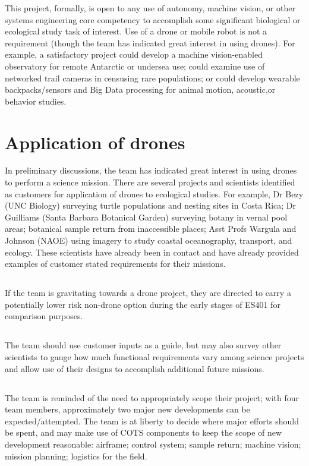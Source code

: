 \documentclass[10pt,courier]{navymemo}
\begin{document}
This project, formally, is open to any use of autonomy, machine vision, or other systems engineering core competency to accomplish some significant biological or ecological study task of interest. Use of a drone or mobile robot is not a requirement (though the team has indicated great interest in using drones). For example, a satisfactory project could develop a machine vision-enabled observatory for remote Antarctic or undersea use; could examine use of networked trail cameras in censusing rare populations; or could develop wearable backpacks/sensors and Big Data processing for animal motion, acoustic,or behavior studies.

\section{Application of drones} In preliminary discussions, the team has indicated great interest in using drones to perform a science mission. There are several projects and scientists identified as customers for application of drones to ecological studies. For example, Dr Bezy (UNC Biology) surveying turtle populations and nesting sites in Costa Rica; Dr Guilliams (Santa Barbara Botanical Garden) surveying botany in vernal pool areas; botanical sample return from inaccessible places; Asst Profs Wargula and Johnson (NAOE) using imagery to study coastal oceanography, transport, and ecology. These scientists have already been in contact and have already provided examples of customer stated requirements for their missions.
\subsection{} If the team is gravitating towards a drone project, they are directed to carry a potentially lower risk non-drone option during the early stages of ES401 for comparison purposes.
\subsection{} The team should use customer inputs as a guide, but may also survey other scientists to gauge how much functional requirements vary among science projects and allow use of their designs to accomplish additional future missions. 
\subsection{} The team is reminded of the need to appropriately scope their project; with four team members, approximately two major new developments can be expected/attempted. The team is at liberty to decide where major efforts should be spent, and may make use of COTS components to keep the scope of new development reasonable:  airframe; control system; sample return; machine vision; mission planning; logistics for the field. 
\end{document}
